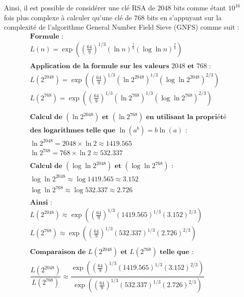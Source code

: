 \documentclass{article}
\begin{document}
Ainsi, il est possible de considérer une clé RSA de \(2048\)
bits comme étant \(10^{16}\) fois plus complexe à calculer qu'une clé de
\(768\) bits en s'appuyant sur la complexité de l'algorithme General
Number Field Sieve (GNFS) comme suit : \\
\[ \begin{array}{l}
	\textbf{Formule :}\\
	L(n) = \exp\left(\left({\frac{64}{9}}\right)^{1/3} \left(\ln n\right)^{\frac{1}{3}} \left(\log \ln n\right)^{\frac{2}{3}}\right) \\ \\
	\textbf{Application de la formule sur les valeurs } 2048 \textbf{ et } 768 \textbf{ :}\\
	L(2^{2048}) = \exp\left(\left({\frac{64}{9}}\right)^{1/3} \left(\ln 2^{2048}\right)^{1/3} \left(\log \ln 2^{2048}\right)^{2/3}\right) \\
	L(2^{768}) = \exp\left(\left({\frac{64}{9}}\right)^{1/3} \left(\ln 2^{768}\right)^{1/3} \left(\log \ln 2^{768}\right)^{2/3}\right) \\ \\
	\textbf{Calcul de } (\ln 2^{2048}) \textbf{ et } (\ln 2^{768}) \textbf{ en utilisant la propriété} \\ \textbf{des logarithmes telle que } \ln(a^{b})=b \ln(a) \textbf{ :}\\
	\ln 2^{2048} = 2048 \times \ln 2 \approx 1419.565 \\
	\ln 2^{768} = 768 \times \ln 2 \approx 532.337 \\ \\
	\textbf{Calcul de } (\log \ln 2^{2048}) \textbf{ et } (\log \ln 2^{768}) \textbf{ :}\\
	\log \ln 2^{2048} \approx \log 1419.565 \approx 3.152 \\
	\log \ln 2^{768} \approx \log 532.337 \approx 2.726 \\
	\\
	\textbf{Ainsi :}\\
	L(2^{2048}) \approx \exp\left(\left({\frac{64}{9}}\right)^{1/3} \left(1419.565\right)^{1/3} \left(3.152\right)^{2/3}\right) \\
	L(2^{768}) \approx \exp\left(\left({\frac{64}{9}}\right)^{1/3} \left(532.337\right)^{1/3} \left(2.726\right)^{2/3}\right)\\ \\
	\textbf{Comparaison de } L(2^{2048}) \textbf{ et } L(2^{768}) \textbf{ telle que :}\\
	\dfrac{L(2^{2048})}{L(2^{768})} \approx \dfrac{\exp\left(\left({\frac{64}{9}}\right)^{1/3} \left(1419.565\right)^{1/3} \left(3.152\right)^{2/3}\right)}{\exp\left(\left({\frac{64}{9}}\right)^{1/3} \left(532.337\right)^{1/3} \left(2.726\right)^{2/3}\right)} \\ \\

\end{array}\]
\end{document}
